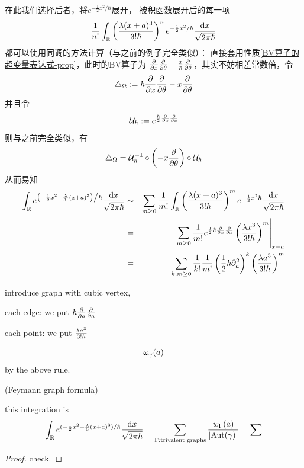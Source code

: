 在此我们选择后者，将$e^{-\frac{1}{2}x^2\big/\hbar}$展开，
被积函数展开后的每一项
$$
  \frac{1}{n!}
    \int_{\mathbb{R}}
      \left(
        \frac{\lambda (x+a)^3}{3!\hbar}
      \right)^n
      e^{-\frac{1}{2}x^2/\hbar}
      \frac{\mathrm{d} x}{\sqrt{2\pi\hbar}}
$$
都可以使用同调的方法计算（与之前的例子完全类似）：
直接套用性质\ref{BV算子的超变量表达式-prop}，此时的BV算子为
$\frac{\partial } {\partial x}\frac{\partial } {\partial \theta}-\frac{x}{\hbar}\frac{\partial } {\partial \theta}$，其实不妨相差常数倍，令
$$\triangle_{\Omega}:=\hbar\frac{\partial } {\partial x}\frac{\partial } {\partial \theta}-x\frac{\partial } {\partial \theta}$$
并且令
$$\mathcal{U}_{\hbar}:=e^{\frac{\hbar}{2}\frac{\partial } {\partial x}\frac{\partial } {\partial x}}$$
则与之前完全类似，有
$$\triangle_\Omega
=\mathcal{U}_\hbar^{-1}\circ
\left(-x\frac{\partial } {\partial \theta}\right)\circ\mathcal{U}_\hbar$$
从而易知
\begin{eqnarray*}
     \int_{\mathbb{R}}
       e^{\big(
            -\frac{1}{2}x^2
            +\frac{\lambda}{3!}(x+a)^3
          \big)
          \big/\hbar}
       \frac{\mathrm{d} x}{\sqrt{2\pi\hbar}}
&\sim&
     \sum_{m\geq 0}\frac{1}{m!}
       \int_{\mathbb{R}}
         \left(
           \frac{\lambda(x+a)^3}{3!\hbar}
         \right)^m
         e^{-\frac{1}{2}x^2\hbar}
       \frac{\mathrm{d} x}{\sqrt{2\pi\hbar}}\\
&=&
     \left.
       \sum_{m\geq 0}\frac{1}{m!}
         e^{\frac{1}{2}\hbar\frac{\partial } {\partial x}\frac{\partial } {\partial x}}
         \left(
           \frac{\lambda x^3}{3!\hbar}
         \right)^m
     \right|_{x=a}\\
&=&
     \sum_{k,m\geq 0}
       \frac{1}{k!}
       \frac{1}{m!}
       \left(
         \frac{1}{2}\hbar\partial_a^2
       \right)^k
       \left(
         \frac{\lambda a^3}{3!\hbar}
       \right)^m
\end{eqnarray*}



introduce graph with cubic vertex,

each edge: we put $\hbar\frac{\partial } {\partial a}\frac{\partial } {\partial a}$

each point: we put $\frac{\lambda a^3}{3!\hbar}$

$$\omega_{\gamma}(a)$$
by the above rule.



\begin{thm}(Feymann graph formula)

this integration is
$$
   \int_{\mathbb{R}}
     e^{(-\frac{1}{2}x^2+\frac{\lambda}{3}(x+a)^3)/\hbar}
     \frac{\mathrm{d} x}{\sqrt{2\pi\hbar}}
=
   \sum_{\Gamma:\text{trivalent graphs}}
     \frac{w_{\Gamma}(a)}
          {|\text{Aut}(\gamma)|}
=
   \sum
$$
\end{thm}
\begin{proof}
check.
\end{proof}

